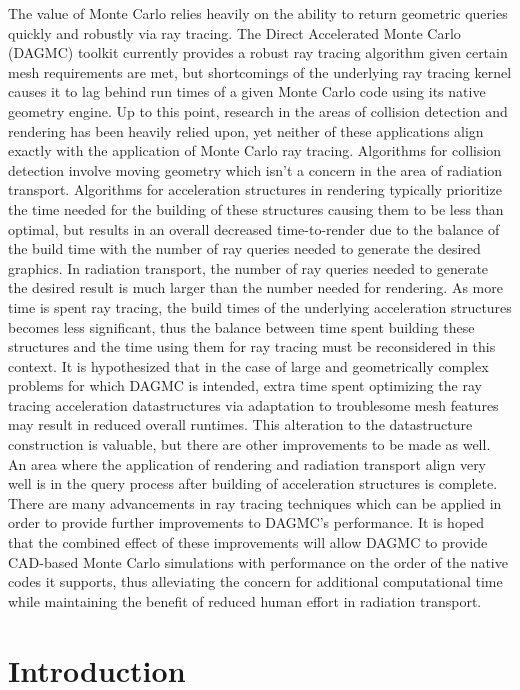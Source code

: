 \documentclass[12pt, a4paper]{article}
\begin{document}
The value of Monte Carlo relies heavily on the ability to return geometric queries quickly and robustly via ray tracing. The Direct Accelerated Monte Carlo (DAGMC) toolkit currently provides a robust ray tracing algorithm\cite{smith_thesis_2011} given certain mesh requirements are met, but shortcomings of the underlying ray tracing kernel causes it to lag behind run times of a given Monte Carlo code using its native geometry engine. Up to this point, research in the areas of collision detection and rendering has been heavily relied upon, yet neither of these applications align exactly with the application of Monte Carlo ray tracing. Algorithms for collision detection involve moving geometry which isn’t a concern in the area of radiation transport. Algorithms for acceleration structures in rendering typically prioritize the time needed for the building of these structures causing them to be less than optimal, but results in an overall decreased time-to-render due to the balance of the build time with the number of ray queries needed to generate the desired graphics. In radiation transport, the number of ray queries needed to generate the desired result is much larger than the number needed for rendering. As more time is spent ray tracing, the build times of the underlying acceleration structures becomes less significant, thus the balance between time spent building these structures and the time using them for ray tracing must be reconsidered in this context. It is hypothesized that in the case of large and geometrically complex problems for which DAGMC is intended, extra time spent optimizing the ray tracing acceleration datastructures via adaptation to troublesome mesh features may result in reduced overall runtimes. This alteration to the datastructure construction is valuable, but there are other improvements to be made as well. An area where the application of rendering and radiation transport align very well is in the query process after building of acceleration structures is complete. There are many advancements in ray tracing techniques which can be applied in order to provide further improvements to DAGMC’s performance. It is hoped that the combined effect of these improvements will allow DAGMC to provide CAD-based Monte Carlo simulations with performance on the order of the native codes it supports, thus alleviating the concern for additional computational time while maintaining the benefit of reduced human effort in radiation transport.

\section{Introduction}%
\end{document}
